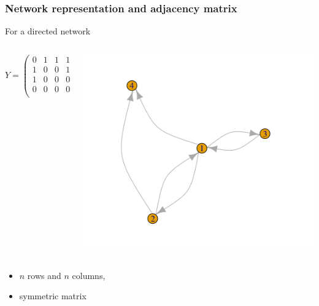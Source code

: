 \documentclass[compress,10pt]{beamer}
\begin{document}
\begin{frame}
\frametitle{Network representation and adjacency matrix}

For a directed network
 \begin{columns}
 \begin{column}{.45\paperwidth}
$$Y=\left(
\begin{array}{rrrrr}
0 & 1 & 1 & 1 \\ 
 1 & 0 & 0 & 1 \\ 
 1 & 0 & 0 & 0 \\ 
 0 & 0 & 0 & 0 \\ 
\end{array}\right)
$$
\end{column}

\begin{column}{.5\paperwidth}

\includegraphics[scale=.5]{plots/graphe_adj_dir.png}

\end{column}

\end{columns}

\begin{itemize}
\item $n$ rows and $n$ columns,
\item symmetric   matrix
\end{itemize}

\end{frame}


\end{document}
